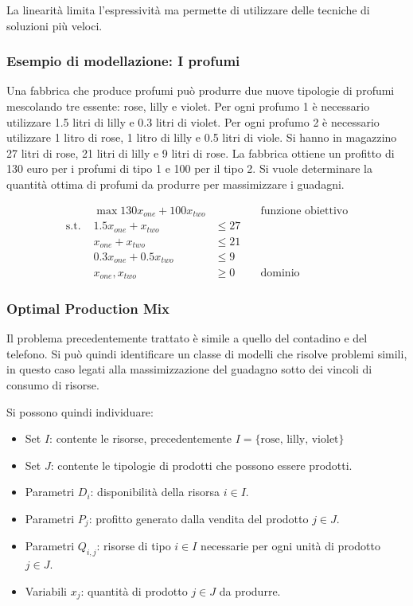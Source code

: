 La linearità limita l'espressività ma permette di utilizzare delle tecniche di soluzioni più veloci.

\subsubsection{Esempio di modellazione: I profumi}

Una fabbrica che produce profumi può produrre due nuove tipologie di profumi mescolando tre essente: rose, lilly e violet. Per ogni profumo 1 è necessario utilizzare 1.5 litri di lilly e 0.3 litri di violet. Per ogni profumo 2 è necessario utilizzare 1 litro di rose, 1 litro di lilly e 0.5 litri di viole.
Si hanno in magazzino 27 litri di rose, 21 litri di lilly e 9 litri di rose. La fabbrica ottiene un profitto di 130 euro per i profumi di tipo 1 e 100 per il tipo 2.
Si vuole determinare la quantità ottima di profumi da produrre per massimizzare i guadagni.

\begin{align*}
&\max 130 x_{one} + 100 x_{two} & & \quad\text{funzione obiettivo} \\
\text{s.t. } &1.5 x_{one} + x_{two} &\leq 27 &\\
					&x_{one} + x_{two} &\leq 21 &\\
					&0.3 x_{one} + 0.5 x_{two} &\leq 9 &\\
					&x_{one}, x_{two} &\geq 0 & \quad\text{dominio}
\end{align*}

\subsubsection{Optimal Production Mix}

Il problema precedentemente trattato è simile a quello del contadino e del telefono.
Si può quindi identificare un classe di modelli che risolve problemi simili, in questo caso legati alla massimizzazione del guadagno sotto dei vincoli di consumo di risorse.

Si possono quindi individuare:

\begin{itemize}
	\item Set $I$: contente le risorse, precedentemente $I = \{\text{rose, lilly, violet}\}$
	\item Set $J$: contente le tipologie di prodotti che possono essere prodotti.
	\item Parametri $D_i$: disponibilità della risorsa $i \in I$.
	\item Parametri $P_j$: profitto generato dalla vendita del prodotto $j \in J$.
	\item Parametri $Q_{i,j}$: risorse di tipo $i \in I$ necessarie per ogni unità di prodotto $j \in J$.
	\item Variabili $x_j$: quantità di prodotto $j \in J$ da produrre.
\end{itemize}

